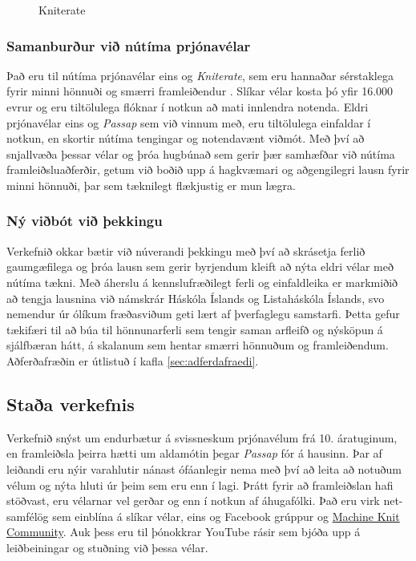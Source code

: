 \documentclass[a4paper,12pt,twoside]{article}
\begin{document}
\begin{figure}
\begin{minipage}[b]{0.45\linewidth}
        \caption{Kniterate}
        \label{fig:kniterate}
    \end{minipage}
\end{figure}



\subsubsection{Samanburður við nútíma prjónavélar}
Það eru til nútíma prjónavélar eins og \emph{Kniterate}, sem eru hannaðar sérstaklega fyrir minni hönnuði og smærri framleiðendur \cite{kniterate}. Slíkar vélar kosta þó yfir 16.000 evrur og eru tiltölulega flóknar í notkun að mati innlendra notenda. Eldri prjónavélar eins og \textit{Passap} sem við vinnum með, eru tiltölulega einfaldar í notkun, en skortir nútíma tengingar og notendavænt viðmót. Með því að snjallvæða þessar vélar og þróa hugbúnað sem gerir þær samhæfðar við nútíma framleiðsluaðferðir, getum við boðið upp á hagkvæmari og aðgengilegri lausn fyrir minni hönnuði, þar sem tæknilegt flækjustig er mun lægra.

\subsubsection{Ný viðbót við þekkingu}
Verkefnið okkar bætir við núverandi þekkingu með því að skrásetja ferlið gaumgæfilega og þróa lausn sem gerir byrjendum kleift að nýta eldri vélar með nútíma tækni. Með áherslu á kennslufræðilegt ferli og einfaldleika er markmiðið að tengja lausnina við námskrár Háskóla Íslands og Listaháskóla Íslands, svo nemendur úr ólíkum fræðasviðum geti lært af þverfaglegu samstarfi. Þetta gefur tækifæri til að búa til hönnunarferli sem tengir saman arfleifð og nýsköpun á sjálfbæran hátt, á skalanum sem hentar smærri hönnuðum og framleiðendum. Aðferðafræðin er útlistuð í kafla \ref{sec:adferdafraedi}.

\subsection{Staða verkefnis}
Verkefnið snýst um endurbætur á svissneskum prjónavélum frá 10. áratuginum, en framleiðsla þeirra hætti um aldamótin þegar \textit{Passap} fór á hausinn. Þar af leiðandi eru nýir varahlutir nánast ófáanlegir nema með því að leita að notuðum vélum og nýta hluti úr þeim sem eru enn í lagi. Þrátt fyrir að framleiðslan hafi stöðvast, eru vélarnar vel gerðar og enn í notkun af áhugafólki. Það eru virk net-samfélög sem einblína á slíkar vélar, eins og Facebook grúppur og \href{https://www.mkc.community/}{Machine Knit Community}. Auk þess eru til þónokkrar YouTube rásir sem bjóða upp á leiðbeiningar og stuðning við þessa vélar.
\end{document}
